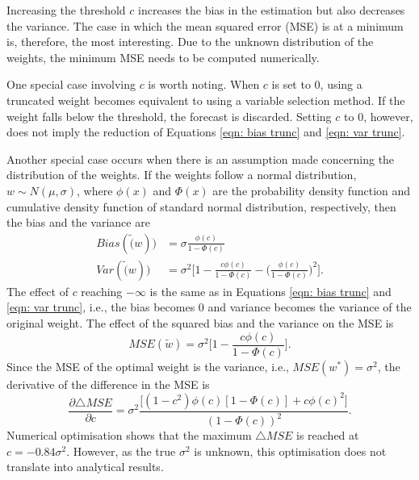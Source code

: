 \documentclass[11pt]{article}
\begin{document}
	Increasing the threshold $c$ increases the bias in the estimation but also decreases the variance. The case in which the mean squared error (MSE) is at a minimum is, therefore, the most interesting. Due to the unknown distribution of the weights, the minimum MSE needs to be computed numerically.
	
	One special case involving $c$ is worth noting. When $c$ is set to $0$, using a truncated weight becomes equivalent to using a variable selection method. If the weight falls below the threshold, the forecast is discarded. Setting $c$ to $0$, however, does not imply the reduction of Equations \ref{eqn: bias trunc} and \ref{eqn: var trunc}.
	
	Another special case occurs when there is an assumption made concerning the distribution of the weights. If the weights follow a normal distribution, $w\sim N(\mu,\sigma)$, where $\phi(x)$ and $\Phi(x)$ are the probability density function and cumulative density function of standard normal distribution, respectively, then the bias and the variance are 
	\begin{equation}
	\label{eqn: trunc norm}
	\begin{aligned}
	Bias(\tilde(w)) &= \sigma \frac{\phi(c)}{1-\Phi(c)}\\
	Var(\tilde(w)) &= \sigma^2 \bigg[1-\frac{c\phi(c)}{1-\Phi(c)}-\big(\frac{\phi(c)}{1-\Phi(c)}\big)^2\bigg].
	\end{aligned}
	\end{equation}
	The effect of $c$ reaching $-\infty$ is the same as in Equations \ref{eqn: bias trunc} and \ref{eqn: var trunc}, i.e., the bias becomes $0$ and variance becomes the variance of the original weight. The effect of the squared bias and the variance on the MSE is
	\begin{equation}
	\label{eqn: trunc mse}
	MSE(\tilde{w}) = \sigma^2 \bigg[ 1 -\frac{c\phi(c)}{1-\Phi(c)}\bigg].
	\end{equation}
	Since the MSE of the optimal weight is the variance, i.e., $MSE(w^*) = \sigma^2$, the derivative of the difference in the MSE is
	\begin{equation}
	\frac{\partial \triangle MSE}{\partial c} = \sigma^2\frac{\bigg[(1-c^2)\phi(c)[1-\Phi(c)]+c\phi(c)^2\bigg]}{(1-\Phi(c))^2}.
	\end{equation}
	Numerical optimisation shows that the maximum $\triangle MSE$ is reached at $c=-0.84\sigma^2$. However, as the true $\sigma^2$ is unknown, this optimisation does not translate into analytical results.
	
\end{document}
